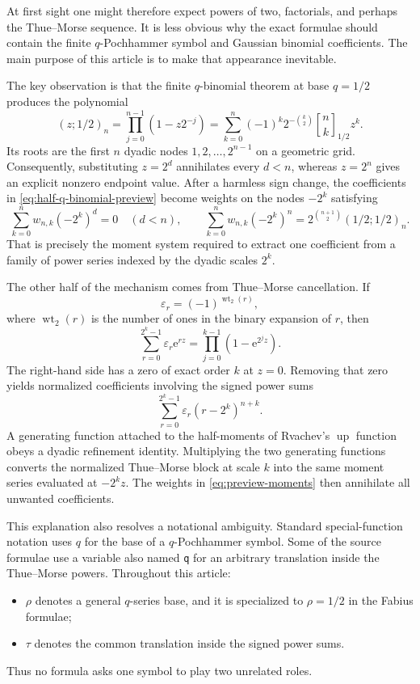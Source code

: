 \documentclass[11pt]{article}
\theoremstyle{definition}
\newcommand{\Up}{\operatorname{up}}
\newcommand{\eps}{\varepsilon}
\newcommand{\wt}{\operatorname{wt}_2}
\newcommand{\qpoch}[3]{\left(#1;#2\right)_{#3}}
\newcommand{\Qbin}[3]{\genfrac{[}{]}{0pt}{}{#1}{#2}_{#3}}
\newcommand{\e}{\mathrm{e}}
\newcommand{\lean}[1]{\nolinkurl{#1}}
\begin{document}
At first sight one might therefore expect powers of two, factorials, and perhaps the Thue--Morse sequence.  It is less obvious why the exact formulae should contain the finite $q$-Pochhammer symbol and Gaussian binomial coefficients.  The main purpose of this article is to make that appearance inevitable.

The key observation is that the finite $q$-binomial theorem at base $q=1/2$ produces the polynomial
\begin{equation}
  \qpoch{z}{1/2}{n}
  =\prod_{j=0}^{n-1}(1-z2^{-j})
  =\sum_{k=0}^{n}(-1)^k2^{-\binom{k}{2}}
       \Qbin{n}{k}{1/2}z^k.
  \label{eq:half-q-binomial-preview}
\end{equation}
Its roots are the first $n$ dyadic nodes $1,2,\ldots,2^{n-1}$ on a geometric grid.  Consequently, substituting $z=2^d$ annihilates every $d<n$, whereas $z=2^n$ gives an explicit nonzero endpoint value.  After a harmless sign change, the coefficients in \cref{eq:half-q-binomial-preview} become weights on the nodes $-2^k$ satisfying
\begin{equation}
  \sum_{k=0}^{n}w_{n,k}(-2^k)^d=0\quad(d<n),
  \qquad
  \sum_{k=0}^{n}w_{n,k}(-2^k)^n
  =2^{\binom{n+1}{2}}\qpoch{1/2}{1/2}{n}.
  \label{eq:preview-moments}
\end{equation}
That is precisely the moment system required to extract one coefficient from a family of power series indexed by the dyadic scales $2^k$.

The other half of the mechanism comes from Thue--Morse cancellation.  If
\[
  \eps_r=(-1)^{\wt(r)},
\]
where $\wt(r)$ is the number of ones in the binary expansion of $r$, then
\begin{equation}
  \sum_{r=0}^{2^k-1}\eps_r \e^{rz}
  =\prod_{j=0}^{k-1}(1-\e^{2^jz}).
  \label{eq:tm-product-preview}
\end{equation}
The right-hand side has a zero of exact order $k$ at $z=0$.  Removing that zero yields normalized coefficients involving the signed power sums
\[
  \sum_{r=0}^{2^k-1}\eps_r(r-2^k)^{n+k}.
\]
A generating function attached to the half-moments of Rvachev's $\Up$ function obeys a dyadic refinement identity.  Multiplying the two generating functions converts the normalized Thue--Morse block at scale $k$ into the same moment series evaluated at $-2^kz$.  The weights in \cref{eq:preview-moments} then annihilate all unwanted coefficients.

This explanation also resolves a notational ambiguity.  Standard special-function notation uses $q$ for the base of a $q$-Pochhammer symbol.  Some of the source formulae use a variable also named \lean{q} for an arbitrary translation inside the Thue--Morse powers.  Throughout this article:
\begin{itemize}[leftmargin=2em]
  \item $\rho$ denotes a general $q$-series base, and it is specialized to $\rho=1/2$ in the Fabius formulae;
  \item $\tau$ denotes the common translation inside the signed power sums.
\end{itemize}
Thus no formula asks one symbol to play two unrelated roles.
\end{document}
